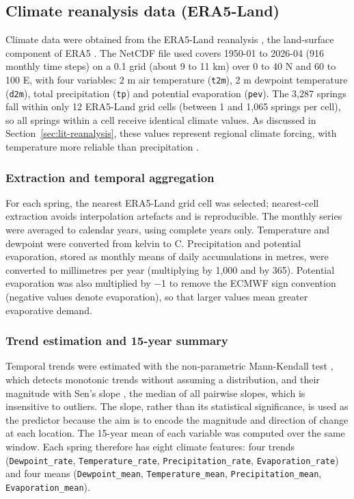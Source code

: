 \documentclass[12pt,a4paper]{article}
\begin{document}
\subsection{Climate reanalysis data (ERA5-Land)}\label{sec:era5}

Climate data were obtained from the ERA5-Land reanalysis \citep{munozsabater2021}, the land-surface component of ERA5 \citep{hersbach2020}. The NetCDF file used covers 1950-01 to 2026-04 (916 monthly time steps) on a 0.1\textdegree{} grid (about 9 to 11 km) over 0 to 40\textdegree{} N and 60 to 100\textdegree{} E, with four variables: 2 m air temperature (\texttt{t2m}), 2 m dewpoint temperature (\texttt{d2m}), total precipitation (\texttt{tp}) and potential evaporation (\texttt{pev}). The 3,287 springs fall within only 12 ERA5-Land grid cells (between 1 and 1,065 springs per cell), so all springs within a cell receive identical climate values. As discussed in Section~\ref{sec:lit-reanalysis}, these values represent regional climate forcing, with temperature more reliable than precipitation \citep{khadka2022,lavers2022}.

\subsubsection{Extraction and temporal aggregation}

For each spring, the nearest ERA5-Land grid cell was selected; nearest-cell extraction avoids interpolation artefacts and is reproducible. The monthly series were averaged to calendar years, using complete years only. Temperature and dewpoint were converted from kelvin to \textdegree{}C. Precipitation and potential evaporation, stored as monthly means of daily accumulations in metres, were converted to millimetres per year (multiplying by 1,000 and by 365). Potential evaporation was also multiplied by $-$1 to remove the ECMWF sign convention (negative values denote evaporation), so that larger values mean greater evaporative demand.

\subsubsection{Trend estimation and 15-year summary}

Temporal trends were estimated with the non-parametric Mann-Kendall test \citep{mann1945}, which detects monotonic trends without assuming a distribution, and their magnitude with Sen's slope \citep{sen1968}, the median of all pairwise slopes, which is insensitive to outliers. The slope, rather than its statistical significance, is used as the predictor because the aim is to encode the magnitude and direction of change at each location. The 15-year mean of each variable was computed over the same window. Each spring therefore has eight climate features: four trends (\texttt{Dewpoint\_\allowbreak{}rate}, \texttt{Temperature\_\allowbreak{}rate}, \texttt{Precipitation\_\allowbreak{}rate}, \texttt{Evaporation\_\allowbreak{}rate}) and four means (\texttt{Dewpoint\_\allowbreak{}mean}, \texttt{Temperature\_\allowbreak{}mean}, \texttt{Precipitation\_\allowbreak{}mean}, \texttt{Evaporation\_\allowbreak{}mean}).
\end{document}
